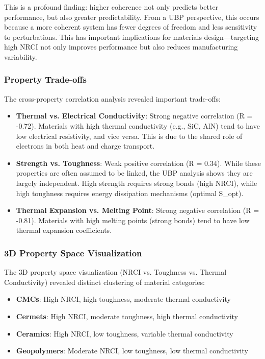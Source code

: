 \documentclass[11pt,a4paper]{article}
\begin{document}
This is a profound finding: higher coherence not only predicts better performance, but also greater predictability. From a UBP perspective, this occurs because a more coherent system has fewer degrees of freedom and less sensitivity to perturbations. This has important implications for materials design—targeting high NRCI not only improves performance but also reduces manufacturing variability.

\subsubsection{Property Trade-offs}

The cross-property correlation analysis revealed important trade-offs:

\begin{itemize}
    \item \textbf{Thermal vs. Electrical Conductivity}: Strong negative correlation (R = -0.72). Materials with high thermal conductivity (e.g., SiC, AlN) tend to have low electrical resistivity, and vice versa. This is due to the shared role of electrons in both heat and charge transport.
    
    \item \textbf{Strength vs. Toughness}: Weak positive correlation (R = 0.34). While these properties are often assumed to be linked, the UBP analysis shows they are largely independent. High strength requires strong bonds (high NRCI), while high toughness requires energy dissipation mechanisms (optimal S\_opt).
    
    \item \textbf{Thermal Expansion vs. Melting Point}: Strong negative correlation (R = -0.81). Materials with high melting points (strong bonds) tend to have low thermal expansion coefficients.
\end{itemize}

\subsubsection{3D Property Space Visualization}

The 3D property space visualization (NRCI vs. Toughness vs. Thermal Conductivity) revealed distinct clustering of material categories:

\begin{itemize}
    \item \textbf{CMCs}: High NRCI, high toughness, moderate thermal conductivity
    \item \textbf{Cermets}: High NRCI, moderate toughness, high thermal conductivity
    \item \textbf{Ceramics}: High NRCI, low toughness, variable thermal conductivity
    \item \textbf{Geopolymers}: Moderate NRCI, low toughness, low thermal conductivity
\end{itemize}
\end{document}
